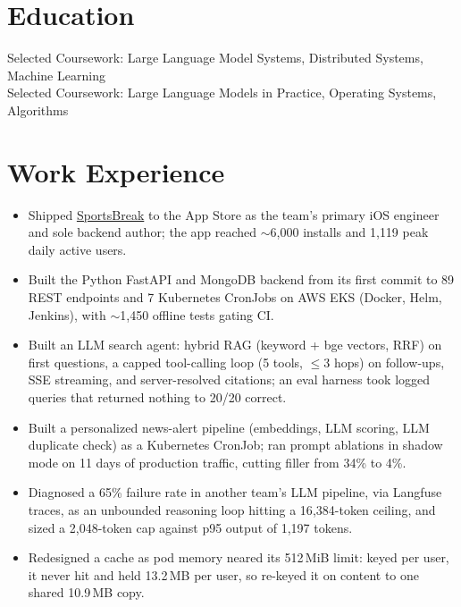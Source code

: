 \documentclass[11pt, letterpaper]{article}
\begin{document}

\section{Education}
Selected Coursework: Large Language Model Systems, Distributed Systems, Machine Learning\\[1pt]
Selected Coursework: Large Language Models in Practice, Operating Systems, Algorithms

\section{Work Experience}
\begin{itemize}
  \item Shipped \href{https://apps.apple.com/app/id6762649287}{SportsBreak} to the App Store as the team's primary iOS engineer and sole backend author; the app reached $\sim$6{,}000 installs and 1{,}119 peak daily active users.
  \item Built the Python FastAPI and MongoDB backend from its first commit to 89 REST endpoints and 7 Kubernetes CronJobs on AWS EKS (Docker, Helm, Jenkins), with $\sim$1{,}450 offline tests gating CI.
  \item Built an LLM search agent: hybrid RAG (keyword + bge vectors, RRF) on first questions, a capped tool-calling loop (5 tools, $\le$3 hops) on follow-ups, SSE streaming, and server-resolved citations; an eval harness took logged queries that returned nothing to 20/20 correct.
  \item Built a personalized news-alert pipeline (embeddings, LLM scoring, LLM duplicate check) as a Kubernetes CronJob; ran prompt ablations in shadow mode on 11 days of production traffic, cutting filler from 34\% to 4\%.
  \item Diagnosed a 65\% failure rate in another team's LLM pipeline, via Langfuse traces, as an unbounded reasoning loop hitting a 16{,}384-token ceiling, and sized a 2{,}048-token cap against p95 output of 1{,}197 tokens.
  \item Redesigned a cache as pod memory neared its 512\,MiB limit: keyed per user, it never hit and held 13.2\,MB per user, so re-keyed it on content to one shared 10.9\,MB copy.
\end{itemize}
\end{document}
